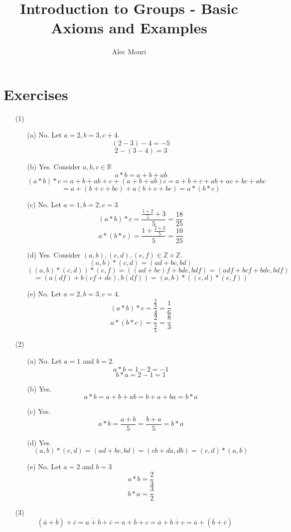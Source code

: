 \documentclass[12pt]{article}
\begin{document}
\title{Introduction to Groups - Basic Axioms and Examples}
\author{Alec Mouri}

\maketitle
\section*{Exercises}
\begin{itemize}
\item[(1)]
\begin{itemize}
\item[(a)] No. Let $a = 2, b = 3, c + 4$.
$$(2 - 3) - 4 = -5$$
$$2 - (3 - 4) = 3$$
\item[(b)] Yes. Consider $a, b, c \in \mathbb{R}$
$$a * b = a + b + ab$$
$$(a * b) * c = a + b + ab + c + (a + b + ab)c = a + b + c + ab + ac + bc + abc$$
$$= a + (b + c + bc) + a(b + c + bc) = a * (b * c)$$
\item[(c)] No. Let $a = 1, b = 2, c = 3$
$$(a * b) * c = \frac{\frac{1 + 2}{5} + 3}{5} = \frac{18}{25}$$
$$a * (b * c) = \frac{1 + \frac{2 + 3}{5}}{5} = \frac{10}{25}$$
\item[(d)] Yes. Consider $(a, b), (c, d), (e, f) \in \mathbb{Z} \times \mathbb{Z}$.
$$(a, b) * (c, d) = (ad + bc, bd)$$
$$((a, b) * (c, d)) * (e, f) = ((ad + bc)f + bde, bdf) = (adf + bcf + bde, bdf)$$
$$= (a(df) + b(cf + de), b(df)) = (a, b) * ((c, d) * (e, f))$$
\item[(e)] No. Let $a = 2, b = 3, c = 4$.
$$(a * b) * c = \frac{\frac{2}{3}}{4} = \frac{1}{6}$$
$$a * (b * c) = \frac{2}{\frac{3}{4}} = \frac{8}{3}$$
\end{itemize}
\item[(2)]
\begin{itemize}
\item[(a)] No. Let $a = 1$ and $b = 2$.
$$a * b = 1 - 2 = -1$$
$$b * a = 2 - 1 = 1$$
\item[(b)]Yes.
$$a * b = a + b + ab = b + a + ba = b * a$$
\item[(c)] Yes.
$$a * b = \frac{a + b}{5} = \frac{b + a}{5} = b * a$$
\item[(d)] Yes.
$$(a, b) * (c, d) = (ad + bc, bd) = (cb + da, db) = (c, d) * (a, b)$$
\item[(e)] No. Let $a = 2$ and $b = 3$
$$a * b = \frac{2}{3}$$
$$b * a = \frac{3}{2}$$
\end{itemize}
\item[(3)]
$$(\overline{a} + \overline{b}) + \overline{c} = \overline{a + b} + \overline{c} = \overline{a + b + c} = \overline{a} + \overline{b + c} = \overline{a} + (\overline{b} + \overline{c})$$

\end{itemize}
\end{document}
